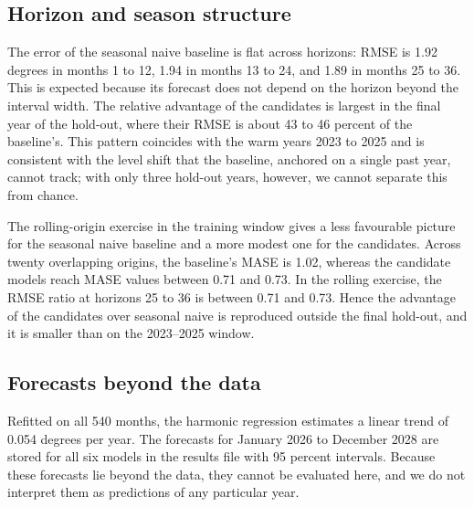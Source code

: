 \subsection{Horizon and season structure}

The error of the seasonal naive baseline is flat across horizons: RMSE is 1.92 degrees in months 1 to 12, 1.94 in months 13 to 24, and 1.89 in months 25 to 36.
This is expected because its forecast does not depend on the horizon beyond the interval width. The relative advantage of the candidates is largest in the final year of the hold-out, where their RMSE is about 43 to 46 percent of the baseline's.
This pattern coincides with the warm years 2023 to 2025 and is consistent with the level shift that the baseline, anchored on a single past year, cannot track; with only three hold-out years, however, we cannot separate this from chance.

The rolling-origin exercise in the training window gives a less favourable picture for the seasonal naive baseline and a more modest one for the candidates. Across twenty overlapping origins, the baseline's MASE is 1.02, whereas the candidate models reach MASE values between 0.71 and 0.73.
In the rolling exercise, the RMSE ratio at horizons 25 to 36 is between 0.71 and 0.73.
Hence the advantage of the candidates over seasonal naive is reproduced outside the final hold-out, and it is smaller than on the 2023--2025 window.

\subsection{Forecasts beyond the data}

Refitted on all 540 months, the harmonic regression estimates a linear trend of 0.054 degrees per year.
The forecasts for January 2026 to December 2028 are stored for all six models in the results file with 95 percent intervals. Because these forecasts lie beyond the data, they cannot be evaluated here, and we do not interpret them as predictions of any particular year.

